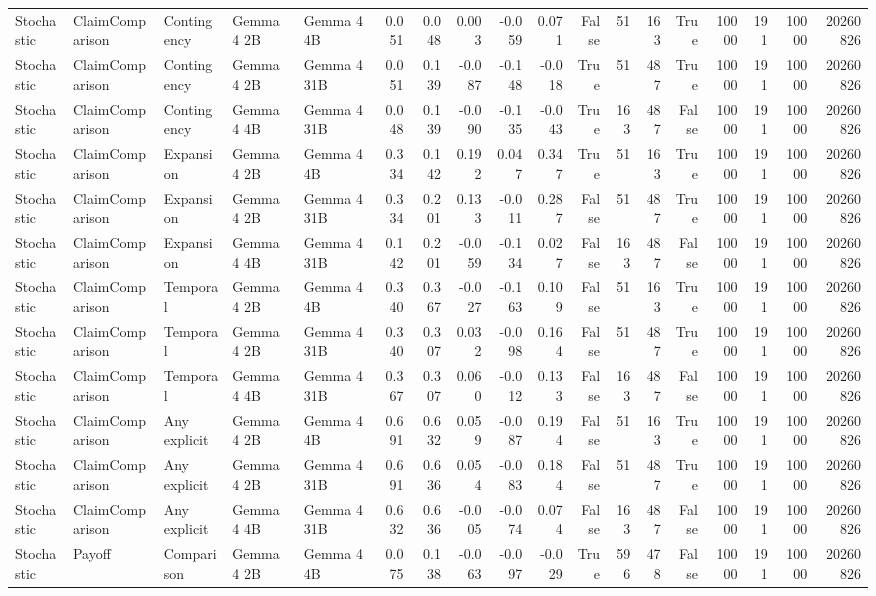 \begin{tabular}{lllllrrrrrrrrrrrrr}
Stochastic & ClaimComparison & Contingency & Gemma 4 2B & Gemma 4 4B & 0.051 & 0.048 & 0.003 & -0.059 & 0.071 & False & 51 & 163 & True & 10000 & 191 & 10000 & 20260826 \\
Stochastic & ClaimComparison & Contingency & Gemma 4 2B & Gemma 4 31B & 0.051 & 0.139 & -0.087 & -0.148 & -0.018 & True & 51 & 487 & True & 10000 & 191 & 10000 & 20260826 \\
Stochastic & ClaimComparison & Contingency & Gemma 4 4B & Gemma 4 31B & 0.048 & 0.139 & -0.090 & -0.135 & -0.043 & True & 163 & 487 & False & 10000 & 191 & 10000 & 20260826 \\
Stochastic & ClaimComparison & Expansion & Gemma 4 2B & Gemma 4 4B & 0.334 & 0.142 & 0.192 & 0.047 & 0.347 & True & 51 & 163 & True & 10000 & 191 & 10000 & 20260826 \\
Stochastic & ClaimComparison & Expansion & Gemma 4 2B & Gemma 4 31B & 0.334 & 0.201 & 0.133 & -0.011 & 0.287 & False & 51 & 487 & True & 10000 & 191 & 10000 & 20260826 \\
Stochastic & ClaimComparison & Expansion & Gemma 4 4B & Gemma 4 31B & 0.142 & 0.201 & -0.059 & -0.134 & 0.027 & False & 163 & 487 & False & 10000 & 191 & 10000 & 20260826 \\
Stochastic & ClaimComparison & Temporal & Gemma 4 2B & Gemma 4 4B & 0.340 & 0.367 & -0.027 & -0.163 & 0.109 & False & 51 & 163 & True & 10000 & 191 & 10000 & 20260826 \\
Stochastic & ClaimComparison & Temporal & Gemma 4 2B & Gemma 4 31B & 0.340 & 0.307 & 0.032 & -0.098 & 0.164 & False & 51 & 487 & True & 10000 & 191 & 10000 & 20260826 \\
Stochastic & ClaimComparison & Temporal & Gemma 4 4B & Gemma 4 31B & 0.367 & 0.307 & 0.060 & -0.012 & 0.133 & False & 163 & 487 & False & 10000 & 191 & 10000 & 20260826 \\
Stochastic & ClaimComparison & Any explicit & Gemma 4 2B & Gemma 4 4B & 0.691 & 0.632 & 0.059 & -0.087 & 0.194 & False & 51 & 163 & True & 10000 & 191 & 10000 & 20260826 \\
Stochastic & ClaimComparison & Any explicit & Gemma 4 2B & Gemma 4 31B & 0.691 & 0.636 & 0.054 & -0.083 & 0.184 & False & 51 & 487 & True & 10000 & 191 & 10000 & 20260826 \\
Stochastic & ClaimComparison & Any explicit & Gemma 4 4B & Gemma 4 31B & 0.632 & 0.636 & -0.005 & -0.074 & 0.074 & False & 163 & 487 & False & 10000 & 191 & 10000 & 20260826 \\
Stochastic & Payoff & Comparison & Gemma 4 2B & Gemma 4 4B & 0.075 & 0.138 & -0.063 & -0.097 & -0.029 & True & 596 & 478 & False & 10000 & 191 & 10000 & 20260826 \\

\end{tabular}
